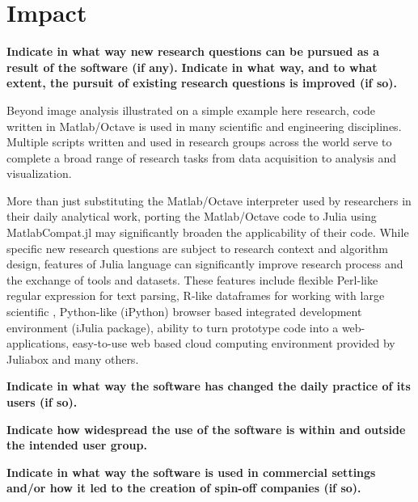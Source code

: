 \section{Impact}
\label{Impact} 

\textbf{Indicate in what way new research questions can be pursued as a result of the software (if any).}
\textbf{Indicate in what way, and to what extent, the pursuit of existing research questions is improved (if so).}

Beyond image analysis illustrated on a simple example here research, code written in Matlab/Octave is used in many scientific and engineering disciplines. Multiple scripts written and used in research groups across the world serve to complete a broad range of research tasks from data acquisition to analysis and visualization.

More than just substituting the Matlab/Octave interpreter used by researchers in their daily analytical work, porting the Matlab/Octave code to Julia using MatlabCompat.jl may significantly broaden the applicability of their code. While specific new research questions are subject to research context and algorithm design, features of Julia language can significantly improve research process and the exchange of tools and datasets. These features include flexible Perl-like regular expression for text parsing, R-like dataframes for working with large scientific , Python-like (iPython) browser based integrated development environment (iJulia package), ability to turn prototype code into a web-applications, easy-to-use web based cloud computing environment provided by Juliabox and many others.

\textbf{Indicate in what way the software has changed the daily practice of its users (if so).}


\textbf{Indicate how widespread the use of the software is within and outside the intended user group.}


\textbf{Indicate in what way the software is used in commercial settings and/or how it led to the creation of spin-off companies (if so).}

  